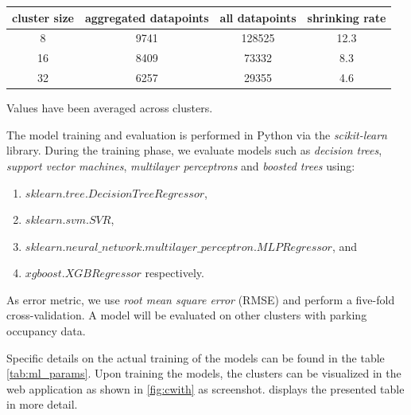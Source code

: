 	\begin{table}[!ht]
		{\begin{tabular}{ | c | c | c | c | } %
				\hline
				{cluster size} & {aggregated datapoints} & {all datapoints} & {shrinking rate} \\ \hline
				8 &	9741 & 128525 &	12.3 \\ \hline
				16 & 8409 &	73332 &	8.3 \\ \hline
				32 & 6257 &	29355 &	4.6 \\ \hline
		\end{tabular}}
		\begin{tabnote}
			Values have been averaged across clusters.
		\end{tabnote}
		\label{tab:models_training_points}
	\end{table}
	
	The model training and evaluation is performed in Python via the \textit{scikit-learn} library. During the training phase, we evaluate models such as \textit{decision trees}, \textit{support vector machines}, \textit{multilayer perceptrons} and \textit{boosted trees} using:
	\begin{enumerate}
		\item $sklearn.tree.DecisionTreeRegressor$,
		\item $sklearn.svm.SVR$,
		\item $sklearn.neural\_network.multilayer\_perceptron.MLPRegressor$, and
		\item $xgboost.XGBRegressor$ respectively.
	\end{enumerate}
	As error metric, we use \textit{root mean square error} (RMSE) and perform a five-fold cross-validation. A model will be evaluated on other clusters with parking occupancy data.
	
	Specific details on the actual training of the models can be found in the table \cref{tab:ml_params}. Upon training the models, the clusters can be visualized in the web application as shown in \cref{fig:cwith} as screenshot.  displays the presented table in more detail.
	
